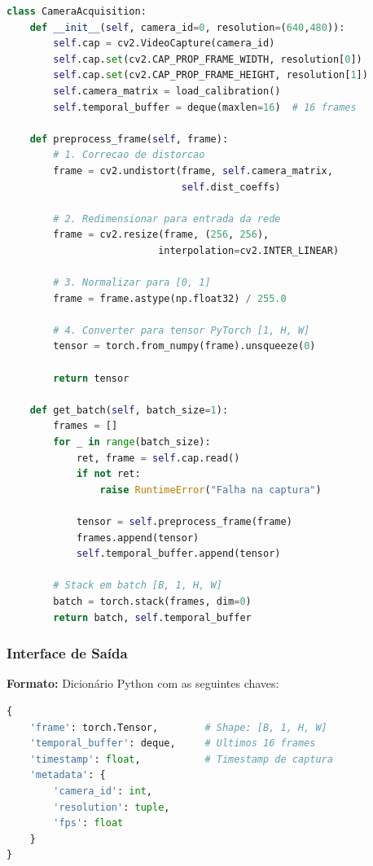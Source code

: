 \documentclass[12pt, a4paper]{article}
\begin{document}
\begin{lstlisting}[language=Python, caption=Módulo 1 - Aquisição]
class CameraAcquisition:
    def __init__(self, camera_id=0, resolution=(640,480)):
        self.cap = cv2.VideoCapture(camera_id)
        self.cap.set(cv2.CAP_PROP_FRAME_WIDTH, resolution[0])
        self.cap.set(cv2.CAP_PROP_FRAME_HEIGHT, resolution[1])
        self.camera_matrix = load_calibration()
        self.temporal_buffer = deque(maxlen=16)  # 16 frames
        
    def preprocess_frame(self, frame):
        # 1. Correcao de distorcao
        frame = cv2.undistort(frame, self.camera_matrix, 
                              self.dist_coeffs)
        
        # 2. Redimensionar para entrada da rede
        frame = cv2.resize(frame, (256, 256), 
                          interpolation=cv2.INTER_LINEAR)
        
        # 3. Normalizar para [0, 1]
        frame = frame.astype(np.float32) / 255.0
        
        # 4. Converter para tensor PyTorch [1, H, W]
        tensor = torch.from_numpy(frame).unsqueeze(0)
        
        return tensor
    
    def get_batch(self, batch_size=1):
        frames = []
        for _ in range(batch_size):
            ret, frame = self.cap.read()
            if not ret:
                raise RuntimeError("Falha na captura")
            
            tensor = self.preprocess_frame(frame)
            frames.append(tensor)
            self.temporal_buffer.append(tensor)
        
        # Stack em batch [B, 1, H, W]
        batch = torch.stack(frames, dim=0)
        return batch, self.temporal_buffer
\end{lstlisting}

\subsubsection{Interface de Saída}

\textbf{Formato:} Dicionário Python com as seguintes chaves:
\begin{lstlisting}[language=Python]
{
    'frame': torch.Tensor,        # Shape: [B, 1, H, W]
    'temporal_buffer': deque,     # Ultimos 16 frames
    'timestamp': float,           # Timestamp de captura
    'metadata': {
        'camera_id': int,
        'resolution': tuple,
        'fps': float
    }
}
\end{lstlisting}
\end{document}
